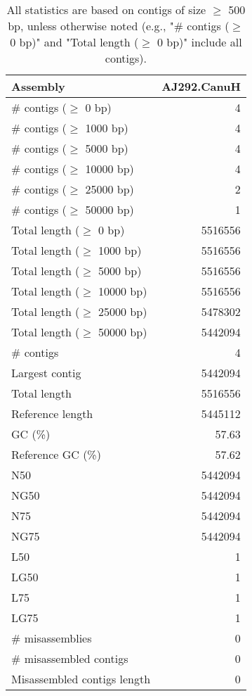 \documentclass[12pt,a4paper]{article}
\begin{document}
\begin{table}[ht]
\begin{center}
\caption{All statistics are based on contigs of size $\geq$ 500 bp, unless otherwise noted (e.g., "\# contigs ($\geq$ 0 bp)" and "Total length ($\geq$ 0 bp)" include all contigs).}
\begin{tabular}{|l*{1}{|r}|}
\hline
Assembly & AJ292.CanuH \\ \hline
\# contigs ($\geq$ 0 bp) & 4 \\ \hline
\# contigs ($\geq$ 1000 bp) & 4 \\ \hline
\# contigs ($\geq$ 5000 bp) & 4 \\ \hline
\# contigs ($\geq$ 10000 bp) & 4 \\ \hline
\# contigs ($\geq$ 25000 bp) & 2 \\ \hline
\# contigs ($\geq$ 50000 bp) & 1 \\ \hline
Total length ($\geq$ 0 bp) & 5516556 \\ \hline
Total length ($\geq$ 1000 bp) & 5516556 \\ \hline
Total length ($\geq$ 5000 bp) & 5516556 \\ \hline
Total length ($\geq$ 10000 bp) & 5516556 \\ \hline
Total length ($\geq$ 25000 bp) & 5478302 \\ \hline
Total length ($\geq$ 50000 bp) & 5442094 \\ \hline
\# contigs & 4 \\ \hline
Largest contig & 5442094 \\ \hline
Total length & 5516556 \\ \hline
Reference length & 5445112 \\ \hline
GC (\%) & 57.63 \\ \hline
Reference GC (\%) & 57.62 \\ \hline
N50 & 5442094 \\ \hline
NG50 & 5442094 \\ \hline
N75 & 5442094 \\ \hline
NG75 & 5442094 \\ \hline
L50 & 1 \\ \hline
LG50 & 1 \\ \hline
L75 & 1 \\ \hline
LG75 & 1 \\ \hline
\# misassemblies & 0 \\ \hline
\# misassembled contigs & 0 \\ \hline
Misassembled contigs length & 0 \\ \hline

\end{tabular}
\end{center}
\end{table}
\end{document}
